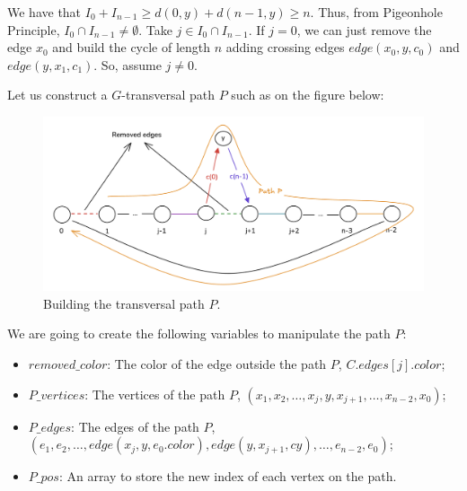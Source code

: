 We have that $I_0 + I_{n-1} \geq d(0, y) + d(n-1, y) \geq n$. Thus, 
from Pigeonhole Principle, $I_0 \cap I_{n-1} \neq \emptyset$. Take $j \in I_0 \cap I_{n-1}$.
If $j = 0$, we can just remove the edge $x_0$ and build the cycle of length $n$ 
adding crossing edges $edge(x_0, y, c_0)$ and $edge(y, x_1, c_1)$. So, assume $j \neq 0$.

Let us construct a $G$-transversal path $P$ such as on the figure below:

\begin{figure}[H]
    \centering
    \includegraphics[width=1\textwidth]{figuras/cycle_n-1_build_path.png}
    \caption{Building the transversal path $P$.}
    \label{fig:cycle_n-1_build_path}
\end{figure}

We are going to create the following variables to manipulate the path $P$:

\begin{itemize}
    \item $removed\_color$: The color of the edge outside the path $P$, $C.edges[j].color$;
    \item $P\_vertices$: The vertices of the path $P$, $(x_1, x_2, \dots, x_{j}, y, x_{j+1}, \dots, x_{n-2}, x_{0})$;
    \item $P\_edges$: The edges of the path $P$, $(e_1, e_2, \dots, edge(x_j, y, e_0.color), edge(y, x_{j+1}, cy), \dots, e_{n-2}, e_{0})$;
    \item $P\_pos$: An array to store the new index of each vertex on the path.
\end{itemize}

